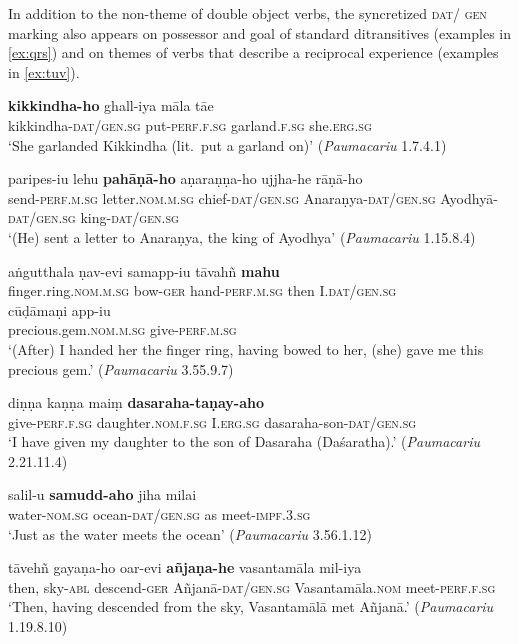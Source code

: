 \documentclass[output=paper,
modfonts
]{LSP/langsci}
\begin{document}
 In addition to the non-theme  of double object verbs, the syncretized \textsc{dat/ gen}  marking also  appears on possessor and goal  of standard ditransitives (examples in \cref{ex:qrs}) and on themes of  verbs that describe a reciprocal experience (examples in \cref{ex:tuv}).  
\begin{exe}
\ex\label{ex:qrs}
\begin{xlist}
\ex\label{ex:kikkindhaho}\gll \textbf{kikkindha-ho} ghall-iya māla tāe \\
kikkindha-\textsc{dat/gen.sg} put-\textsc{perf.f.sg} garland.\textsc{f.sg} she.\textsc{erg.sg} \\
\glt `She garlanded Kikkindha (lit.\ put a garland on)' (\textit{Paumacariu} 1.7.4.1)

\ex\label{ex:paripesiu}\gll paripes-iu lehu \textbf{pahāṇā-ho}   aṇaraṇṇa-ho  ujjha-he rāṇā-ho \\
send-\textsc{perf.m.sg} letter.\textsc{nom.m.sg}  chief-\textsc{dat/gen.sg} Anaraṇya-\textsc{dat/gen.sg} Ayodhyā-\textsc{dat/gen.sg} king-\textsc{dat/gen.sg} \\
\glt `(He) sent a letter to  Anaraṇya, the king of Ayodhya' (\textit{Paumacariu} 1.15.8.4)

\ex\label{ex:angutthala}\gll aṅgutthala ṇav-evi samapp-iu   tāvahñ \textbf{mahu} \\
finger.ring.\textsc{nom.m.sg} bow-\textsc{ger} hand-\textsc{perf.m.sg} then  I.\textsc{dat/gen.sg}\\

\gll cūḍāmaṇi app-iu \\
precious.gem.\textsc{nom.m.sg} give-\textsc{perf.m.sg} \\
\glt `(After) I handed her the finger ring, having bowed to her, (she) gave me this precious gem.'   (\textit{Paumacariu} 3.55.9.7)

\ex\label{ex:dinna}\gll diṇṇa kaṇṇa maiṃ  \textbf{dasaraha-taṇay-aho} \\
give-\textsc{perf.f.sg} daughter.\textsc{nom.f.sg} I.\textsc{erg.sg} dasaraha-son-\textsc{dat/gen.sg} \\
\glt `I have given my daughter to the son of Dasaraha (Daśaratha).' (\textit{Paumacariu} 2.21.11.4)
\end{xlist}

\ex\label{ex:tuv}
\begin{xlist}
\ex\label{ex:salilu}\gll salil-u \textbf{samudd-aho} jiha milai \\ water-\textsc{nom.sg} ocean-\textsc{dat/gen.sg} as meet-\textsc{impf.3.sg} \\
\glt `Just as the water meets the ocean' (\textit{Paumacariu} 3.56.1.12)

\ex\label{ex:tavehn}\gll tāvehñ gayaṇa-ho oar-evi  \textbf{añjaṇa-he} vasantamāla mil-iya \\
then, sky-\textsc{abl} descend-\textsc{ger}  Añjanā-\textsc{dat/gen.sg} Vasantamāla.\textsc{nom} meet-\textsc{perf.f.sg} \\
\glt `Then, having descended from the sky, Vasantamālā met Añjanā.' (\textit{Paumacariu} 1.19.8.10)
\end{xlist}
\end{exe}
\end{document}
